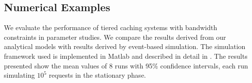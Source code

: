 \subsection{Numerical Examples}\label{sec:results}

We evaluate the performance of tiered caching systems with bandwidth constraints in parameter studies. We compare the results derived from our analytical models with results derived by event-based simulation. The simulation framework used is implemented in Matlab and described in detail in \cite{info3-inproceedings-2015-530}. The results presented show the mean values of 8 runs with 95\% confidence intervals, each run simulating $10^5$ requests in the stationary phase.


